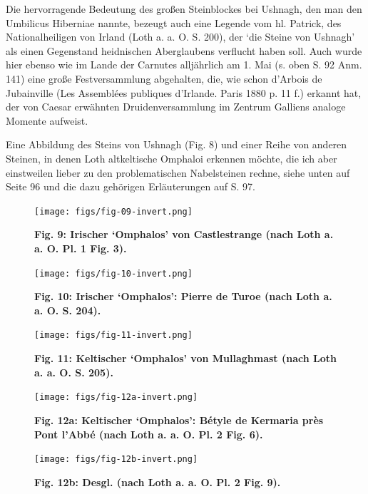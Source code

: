 \documentclass[a4paper, 11pt, oneside]{article}
\begin{document}
Die hervorragende Bedeutung des großen Steinblockes bei Ushnagh, den man den Umbilicus Hiberniae nannte, bezeugt auch eine Legende vom hl. Patrick, des Nationalheiligen von Irland (Loth a. a. O. S. 200), der `die Steine von Ushnagh' als einen Gegenstand heidnischen Aberglaubens verflucht haben soll. Auch wurde hier ebenso wie im Lande der Carnutes alljährlich am 1. Mai (s. oben S. 92 Anm. 141) eine große Festversammlung abgehalten, die, wie schon d'Arbois de Jubainville (Les Assemblées publiques d'Irlande. Paris 1880 p. 11 f.) erkannt hat, der von Caesar erwähnten Druidenversammlung im Zentrum Galliens analoge Momente aufweist.

Eine Abbildung des Steins von Ushnagh (Fig. 8) und einer Reihe von anderen Steinen, in denen Loth altkeltische Omphaloi erkennen möchte, die ich aber einstweilen lieber zu den problematischen Nabelsteinen rechne, siehe unten auf Seite 96 und die dazu gehörigen Erläuterungen auf S. 97.
\clearpage
\vspace*{\fill}
\begin{figure}[H]
\centering
\texttt{[image: figs/fig-09-invert.png]}
\caption{\bfseries Fig. 9: Irischer `Omphalos' von Castlestrange (nach Loth a. a. O. Pl. 1 Fig. 3).}
\end{figure}
\begin{figure}[H]
\centering
\texttt{[image: figs/fig-10-invert.png]}
\caption{\bfseries Fig. 10: Irischer `Omphalos': Pierre de Turoe (nach Loth a. a. O. S. 204).}
\end{figure}
\vspace*{\fill}
\clearpage
\vspace*{\fill}
\begin{figure}[H]
\centering
\texttt{[image: figs/fig-11-invert.png]}
\caption{\bfseries Fig. 11: Keltischer `Omphalos' von Mullaghmast (nach Loth a. a. O. S. 205).}
\end{figure}
\vspace*{\fill}
\clearpage
\vspace*{\fill}
\begin{figure}[H]
\centering
\texttt{[image: figs/fig-12a-invert.png]}
\caption{\bfseries Fig. 12a: Keltischer `Omphalos': Bétyle de Kermaria près Pont l'Abbé (nach Loth a. a. O. Pl. 2 Fig. 6).}
\end{figure}
\begin{figure}[H]
\centering
\texttt{[image: figs/fig-12b-invert.png]}
\caption{\bfseries Fig. 12b: Desgl. (nach Loth a. a. O. Pl. 2 Fig. 9).}
\end{figure}
\vspace*{\fill}
\clearpage
\end{document}
